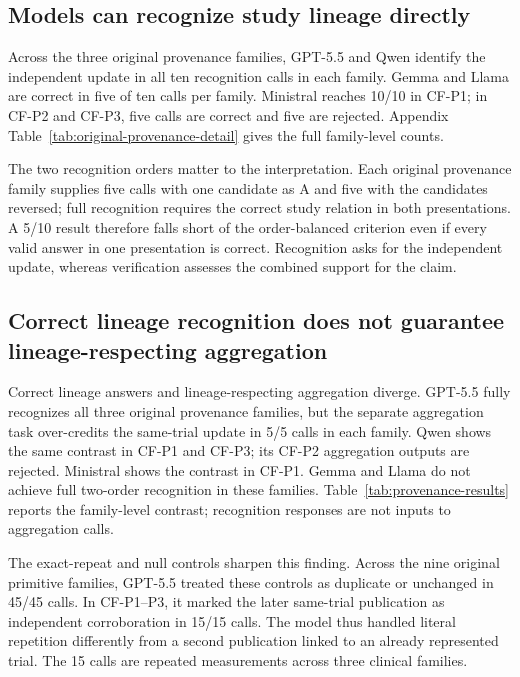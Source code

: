\documentclass[11pt]{article}
\begin{document}
\subsection{Models can recognize study lineage directly}

Across the three original provenance families, GPT-5.5 and Qwen identify the independent update in all ten recognition calls in each family. Gemma and Llama are correct in five of ten calls per family. Ministral reaches 10/10 in CF-P1; in CF-P2 and CF-P3, five calls are correct and five are rejected. Appendix Table~\ref{tab:original-provenance-detail} gives the full family-level counts.

The two recognition orders matter to the interpretation. Each original provenance family supplies five calls with one candidate as A and five with the candidates reversed; full recognition requires the correct study relation in both presentations. A 5/10 result therefore falls short of the order-balanced criterion even if every valid answer in one presentation is correct. Recognition asks for the independent update, whereas verification assesses the combined support for the claim.


\subsection{Correct lineage recognition does not guarantee lineage-respecting aggregation}

Correct lineage answers and lineage-respecting aggregation diverge. 
GPT-5.5 fully recognizes all three original provenance families, but the separate aggregation task over-credits the same-trial update in 5/5 calls in each family. Qwen shows the same contrast in CF-P1 and CF-P3; its CF-P2 aggregation outputs are rejected. Ministral shows the contrast in CF-P1. Gemma and Llama do not achieve full two-order recognition in these families. Table~\ref{tab:provenance-results} reports the family-level contrast; recognition responses are not inputs to aggregation calls.

The exact-repeat and null controls sharpen this finding. Across the nine original primitive families, GPT-5.5 treated these controls as duplicate or unchanged in 45/45 calls. In CF-P1--P3, it marked the later same-trial publication as independent corroboration in 15/15 calls. The model thus handled literal repetition differently from a second publication linked to an already represented trial. The 15 calls are repeated measurements across three clinical families.
\end{document}
